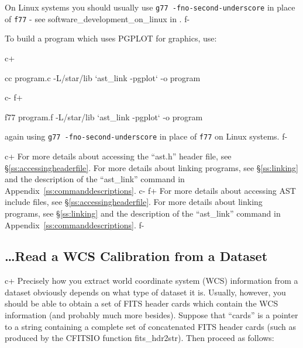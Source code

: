 \documentclass[twoside,11pt]{starlink}
\providecommand{\appref}[1]{Appendix~\ref{#1}}
\providecommand{\secref}[1]{\S\ref{#1}}
\begin{document}
On Linux systems you should usually use \verb+g77 -fno-second-underscore+ in
place of \verb+f77+ - see 
{software_development_on_linux} in .
f-

To build a program which uses PGPLOT for graphics, use:

c+
\begin{small}
\begin{terminalv}
cc program.c -L/star/lib `ast_link -pgplot` -o program
\end{terminalv}
\end{small}
c-
f+
\begin{small}
\begin{terminalv}
f77 program.f -L/star/lib `ast_link -pgplot` -o program
\end{terminalv}
\end{small}

again using \verb+g77 -fno-second-underscore+ in place of \verb+f77+
on Linux systems.
f-

c+
For more details about accessing the ``ast.h'' header file, see
\secref{ss:accessingheaderfile}. For more
details about linking programs, see \secref{ss:linking} and the
description of the ``ast\_link'' command in
\appref{ss:commanddescriptions}.
c-
f+
For more details about accessing AST include files, see
\secref{ss:accessingheaderfile}. For more
details about linking programs, see \secref{ss:linking} and the
description of the ``ast\_link'' command in
\appref{ss:commanddescriptions}.
f-

\subsection{\label{ss:howtoreadwcs}\ldots Read a WCS Calibration from a Dataset}

c+
Precisely how you extract world coordinate system (WCS) information
from a dataset obviously depends on what type of dataset it
is. Usually, however, you should be able to obtain a set of FITS
header cards which contain the WCS information (and probably much more
besides). Suppose that ``cards'' is a pointer to a string
containing a complete set of concatenated FITS header cards (such as
produced by the CFITSIO function fits\_hdr2str). Then proceed as follows:
\end{document}
